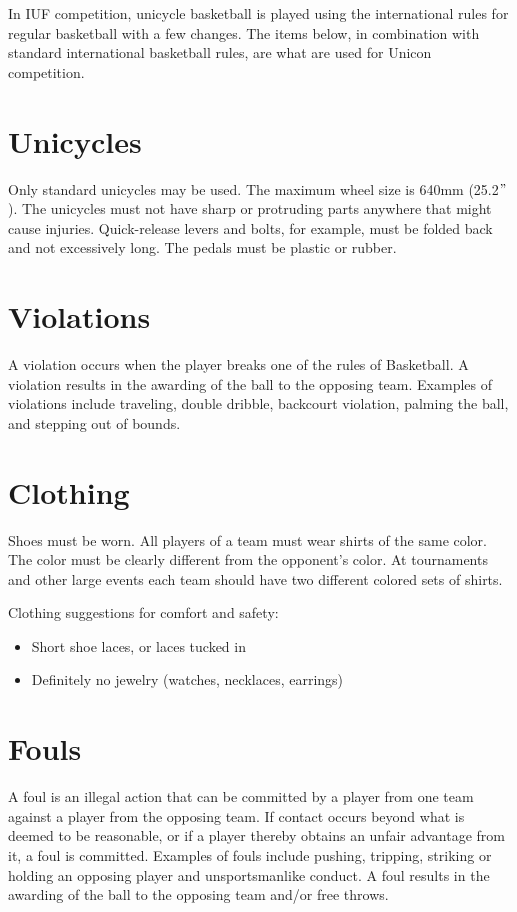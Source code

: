 
In IUF competition, unicycle basketball is played using the international rules for regular basketball with a few changes.
The items below, in combination with standard international basketball rules, are what are used for Unicon competition.

\section{Unicycles}
Only standard unicycles may be used.
The maximum wheel size is 640mm (25.2$"$).
The unicycles must not have sharp or protruding parts anywhere that might
cause injuries.
Quick-release levers and bolts, for example, must be folded back and not excessively long.
The pedals must be plastic or rubber.

\section{Violations}
A violation occurs when the player breaks one of the rules of Basketball.
A violation results in the awarding of the ball to the opposing team.
Examples of violations include traveling, double dribble, backcourt violation, palming the ball, and stepping out of bounds.

\section{Clothing}
Shoes must be worn.
All players of a team must wear shirts of the same color.
The color must be clearly different from the opponent's color.
At tournaments and other large events each team should have two different colored sets of shirts.

Clothing suggestions for comfort and safety:
\begin{itemize}
\item Short shoe laces, or laces tucked in
\item Definitely no jewelry (watches, necklaces, earrings)
\end{itemize}

\section{Fouls}
A foul is an illegal action that can be committed by a player from one team against a player from the opposing team.
If contact occurs beyond what is deemed to be reasonable, or if a player thereby obtains an unfair advantage from it, a foul is committed.
Examples of fouls include pushing, tripping, striking or holding an opposing player and unsportsmanlike conduct.
A foul results in the awarding of the ball to the opposing team and/or free throws.

